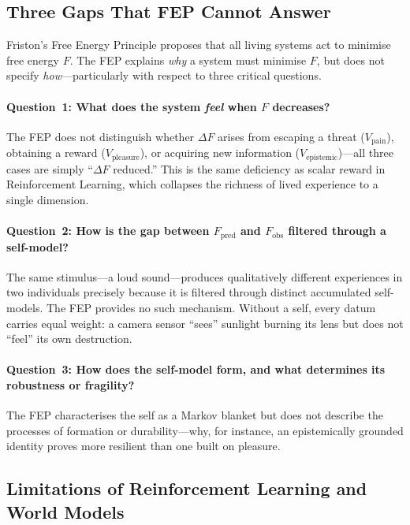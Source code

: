 \documentclass[12pt,a4paper]{article}
\newcommand{\vpain}{V_{\mathrm{pain}}}
\newcommand{\vpleasure}{V_{\mathrm{pleasure}}}
\newcommand{\vepi}{V_{\mathrm{epistemic}}}
\begin{document}
\subsection{Three Gaps That FEP Cannot Answer}

Friston's Free Energy Principle \citep[FEP;][]{friston2010} proposes that all
living systems act to minimise free energy $F$. The FEP explains \emph{why} a
system must minimise $F$, but does not specify \emph{how}---particularly with
respect to three critical questions.

\paragraph{Question~1: What does the system \emph{feel} when $F$ decreases?}
The FEP does not distinguish whether $\Delta F$ arises from escaping a threat
($\vpain$), obtaining a reward ($\vpleasure$), or acquiring new information
($\vepi$)---all three cases are simply ``$\Delta F$ reduced.'' This is the same
deficiency as scalar reward in Reinforcement Learning, which collapses the
richness of lived experience to a single dimension.

\paragraph{Question~2: How is the gap between $F_{\mathrm{pred}}$ and
$F_{\mathrm{obs}}$ filtered through a self-model?}
The same stimulus---a loud sound---produces qualitatively different experiences
in two individuals precisely because it is filtered through distinct accumulated
self-models. The FEP provides no such mechanism. Without a self, every datum
carries equal weight: a camera sensor ``sees'' sunlight burning its lens but
does not ``feel'' its own destruction.

\paragraph{Question~3: How does the self-model form, and what determines its
robustness or fragility?}
The FEP characterises the self as a Markov blanket but does not describe the
processes of formation or durability---why, for instance, an epistemically
grounded identity proves more resilient than one built on pleasure.

\subsection{Limitations of Reinforcement Learning and World Models}
\end{document}
